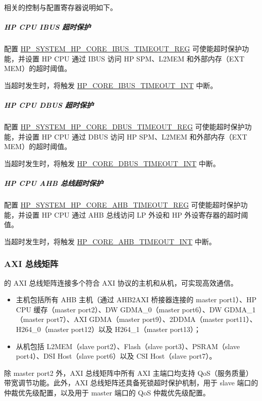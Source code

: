 \documentclass[main\_\_CN.tex]{subfiles}
\begin{document}
相关的控制与配置寄存器说明如下。


\subparagraph{HP CPU IBUS 超时保护}

配置 \hyperref[regdesc:HPSYSTEMHPCOREIBUSTIMEOUTREG]{HP\_SYSTEM\_HP\_CORE\_IBUS\_TIMEOUT\_REG} 可使能超时保护功能，并设置 HP CPU 通过 IBUS 访问 HP SPM、L2MEM 和外部内存（EXT MEM）的超时阈值。

当超时发生时，将触发 \hyperref[tab:sysreg-int-sources]{HP\_CORE\_IBUS\_TIMEOUT\_INT} 中断。


\subparagraph{HP CPU DBUS 超时保护}

配置 \hyperref[regdesc:HPSYSTEMHPCOREDBUSTIMEOUTREG]{HP\_SYSTEM\_HP\_CORE\_DBUS\_TIMEOUT\_REG} 可使能超时保护功能，并设置 HP CPU 通过 DBUS 访问 HP SPM、L2MEM 和外部内存（EXT MEM）的超时阈值。

当超时发生时，将触发 \hyperref[tab:sysreg-int-sources]{HP\_CORE\_DBUS\_TIMEOUT\_INT} 中断。

\subparagraph{HP CPU AHB 总线超时保护}

配置 \hyperref[regdesc:HPSYSTEMHPCOREAHBTIMEOUTREG]{HP\_SYSTEM\_HP\_CORE\_AHB\_TIMEOUT\_REG} 可使能超时保护功能，并设置 HP CPU 通过 AHB 总线访问 LP 外设和 HP 外设寄存器的超时阈值。

当超时发生时，将触发 \hyperref[tab:sysreg-int-sources]{HP\_CORE\_AHB\_TIMEOUT\_INT} 中断。

\subsubsection{AXI 总线矩阵}

\chipname{} 的 AXI 总线矩阵连接多个符合 AXI 协议的主机和从机，可实现高效通信。

\begin{itemize}
    \item 主机包括所有 AHB 主机（通过 AHB2AXI 桥接器连接的 master port1）、HP CPU 缓存（master port2）、DW GDMA\_0（master port6）、DW GDMA\_1（master port7）、AXI GDMA（master port9）、2DDMA（master port11）、H264\_0（master port12）以及 H264\_1（master port13）；
    \item 从机包括 L2MEM（slave port2）、Flash（slave port3）、PSRAM（slave port4）、DSI Host（slave port6）以及 CSI Host（slave port7）。
\end{itemize}

除 master port2 外，AXI 总线矩阵中所有 AXI 主端口均支持 QoS（服务质量）带宽调节功能。此外，AXI 总线矩阵还具备死锁超时保护机制，用于 slave 端口的仲裁优先级配置，以及用于 master 端口的 QoS 仲裁优先级配置。
\end{document}
